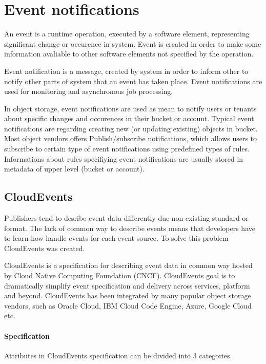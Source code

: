 \section{Event notifications}
    An event is a runtime operation, executed by a software element, representing significant change or occurence in system. Event is created in order to make some information avaliable to other software elements not specified by the operation\cite{eventArchitecturalPatterns}.

    Event notification is a message, created by system in order to inform other to notify other parts of system that an event has taken place\cite{eventRedHatEventDrivenArch}. Event notifications are used for monitoring and asynchronous job processing.

    In object storage, event notifications are used as mean to notify users or tenants about specific changes and occurences in their bucket or account. Typical event notifications are regarding creating new (or updating existing) objects in bucket. Most object vendors offers Publish/subscribe notifications, which allows users to subscribe to certain type of event notifications using predefined types of rules. Informations about rules specifiying event notifications are usually stored in metadata of upper level (bucket or account).

    \subsection{CloudEvents}
    Publishers tend to desribe event data differently due non existing standard or format. The lack of common way to describe events means that developers have to learn how handle events for each event source. To solve this problem CloudEvents was created.

    CloudEvents is a specification for describing event data in common way\cite{eventCloudEvents} hosted by Cloud Native Computing Foundation (CNCF)\cite{eventCNCF}. CloudEvents goal is to dramatically simplify event specification and delivery across services, platform and beyond.
    CloudEvents has been integrated by many popular object storage vendors, such as Oracle Cloud, IBM Cloud Code Engine, Azure, Google Cloud etc.

    \paragraph{Specification}
    Attributes in CloudEvents specification can be divided into 3 categories.

